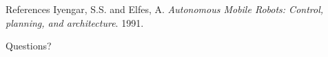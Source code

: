 \documentclass{beamer}
\begin{document}
\begin{thebibliography}{9}

	\begin{frame}{References}
			Iyengar, S.S. and Elfes, A.
			\emph{Autonomous Mobile Robots: Control, planning, and architecture}.
			1991.
			
 	\end{frame}
 	
	\begin{frame}{}
	\begin{alertblock}{}
		\center
		Questions?
	\end{alertblock}
	\end{frame} 	
 	
\end{thebibliography}
 	
\end{document}
